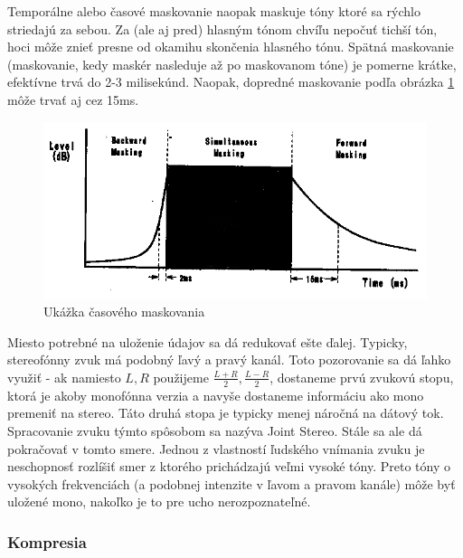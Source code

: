 Temporálne alebo časové maskovanie naopak maskuje tóny ktoré sa rýchlo
striedajú za sebou. Za (ale aj pred) hlasným tónom chvíľu nepočuť
tichší tón, hoci môže znieť presne od okamihu skončenia hlasného tónu.
Spätná maskovanie (maskovanie, kedy maskér nasleduje až po maskovanom
tóne) je pomerne krátke, efektívne trvá do 2-3 milisekúnd.
Naopak, dopredné maskovanie podľa obrázka \ref{fig:temporal_masking}
môže trvať aj cez 15ms.

\begin{figure}[htp]
    \centering
    \includegraphics{obrazky/informatika/audio/temporal_masking}
    \caption{Ukážka časového maskovania}
    \label{fig:temporal_masking}
\end{figure}

Miesto potrebné na uloženie údajov sa dá redukovať ešte ďalej.
Typicky, stereofónny zvuk má podobný ľavý a pravý kanál. Toto
pozorovanie sa dá ľahko využiť - ak namiesto $L,R$ použijeme
$\frac{L+R}{2}, \frac{L-R}{2}$, dostaneme prvú zvukovú stopu, ktorá je
akoby monofónna verzia a navyše dostaneme informáciu ako mono premeniť
na stereo. Táto druhá stopa je typicky menej náročná na dátový tok.
Spracovanie zvuku týmto spôsobom sa nazýva Joint Stereo.
Stále sa ale dá pokračovať v tomto smere. Jednou z vlastností ľudského
vnímania zvuku je neschopnosť rozlíšiť smer z ktorého prichádzajú
veľmi vysoké tóny. Preto tóny o vysokých frekvenciách (a podobnej
intenzite v ľavom a pravom kanále) môže byť uložené mono, nakoľko je
to pre ucho nerozpoznateľné.

\subsubsection{Kompresia}

